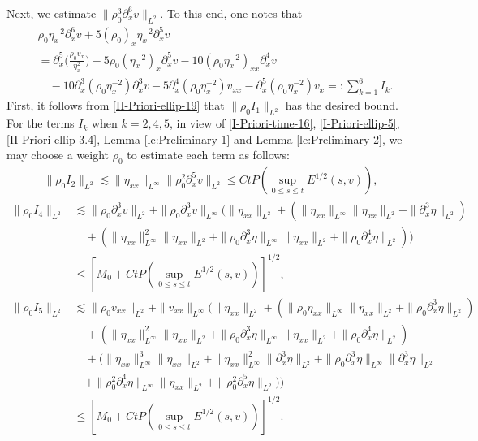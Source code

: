\documentclass[11pt, reqno]{amsart}
\numberwithin{equation}{section}
\begin{document}
{Next, we estimate \(\|\rho_0^3\partial_x^6v\|_{L^2}\).
To this end, one notes that
\begin{equation*}
\begin{aligned}
&\rho_0\eta_x^{-2}\partial_x^6v+5(\rho_0)_x\eta_x^{-2}\partial_x^5v\\
&=\partial_x^5\bigg(\frac{\rho_0v_x}{\eta_x^2}\bigg)-5\rho_0(\eta_x^{-2})_x\partial_x^5v-10(\rho_0\eta_x^{-2})_{xx}\partial_x^4v\\
&\quad-10\partial_x^3(\rho_0\eta_x^{-2})\partial_x^3v-5\partial_x^4(\rho_0\eta_x^{-2})v_{xx}-\partial_x^5(\rho_0\eta_x^{-2})v_{x}=\colon\sum_{k=1}^6I_k.
\end{aligned}
\end{equation*}
First, it follows from \eqref{II-Priori-ellip-19} that \(\|\rho_0I_1\|_{L^2}\) has the desired bound.
For the terms \(I_k\) when \(k=2,4,5\), in view of \eqref{I-Priori-time-16}, \eqref{I-Priori-ellip-5}, \eqref{II-Priori-ellip-3.4}, Lemma \ref{le:Preliminary-1} and Lemma \ref{le:Preliminary-2},
we may choose a weight \(\rho_0\) to estimate each term as follows:
\begin{equation*}
\begin{aligned}
\|\rho_0I_2\|_{L^2}
\lesssim \|\eta_{xx}\|_{L^\infty}\|\rho_0^2\partial_x^5v\|_{L^2}
\leq Ct P(\sup_{0\leq s\leq t}E^{1/2}(s,v)),
\end{aligned}
\end{equation*}
{\small \begin{equation*}
\begin{aligned}
\|\rho_0I_4\|_{L^2}
&\lesssim \|\rho_0\partial_x^3v\|_{L^2}+
\|\rho_0\partial_x^3v\|_{L^\infty}\big(\|\eta_{xx}\|_{L^2}
+(\|\eta_{xx}\|_{L^\infty}\|\eta_{xx}\|_{L^2}
+\|\partial_x^3\eta\|_{L^2})\\
&\quad+(\|\eta_{xx}\|_{L^\infty}^2\|\eta_{xx}\|_{L^2}
+\|\rho_0\partial_x^3\eta\|_{L^\infty}\|\eta_{xx}\|_{L^2}
+\|\rho_0\partial_x^4\eta\|_{L^2})\big)\\
&\leq [M_0+Ct P(\sup_{0\leq s\leq t}E^{1/2}(s,v))]^{1/2},
\end{aligned}
\end{equation*}}
{\small \begin{equation*}
\begin{aligned}
\|\rho_0I_5\|_{L^2}
&\lesssim \|\rho_0v_{xx}\|_{L^2}+
\|v_{xx}\|_{L^\infty}\big(\|\eta_{xx}\|_{L^2}
+(\|\rho_0\eta_{xx}\|_{L^\infty}\|\eta_{xx}\|_{L^2}
+\|\rho_0\partial_x^3\eta\|_{L^2})\\
&\quad+(\|\eta_{xx}\|_{L^\infty}^2\|\eta_{xx}\|_{L^2}
+\|\rho_0\partial_x^3\eta\|_{L^\infty}\|\eta_{xx}\|_{L^2}
+\|\rho_0\partial_x^4\eta\|_{L^2})\\
&\quad+(\|\eta_{xx}\|_{L^\infty}^3\|\eta_{xx}\|_{L^2}
+\|\eta_{xx}\|_{L^\infty}^2\|\partial_x^3\eta\|_{L^2}
+\|\rho_0\partial_x^3\eta\|_{L^\infty}\|\partial_x^3\eta\|_{L^2}\\
&\quad+\|\rho_0^2\partial_x^4\eta\|_{L^\infty}\|\eta_{xx}\|_{L^2}
+\|\rho_0^2\partial_x^5\eta\|_{L^2})\big)\\
&\leq [M_0+Ct P(\sup_{0\leq s\leq t}E^{1/2}(s,v))]^{1/2}.
\end{aligned}
\end{equation*}}

}
\end{document}
